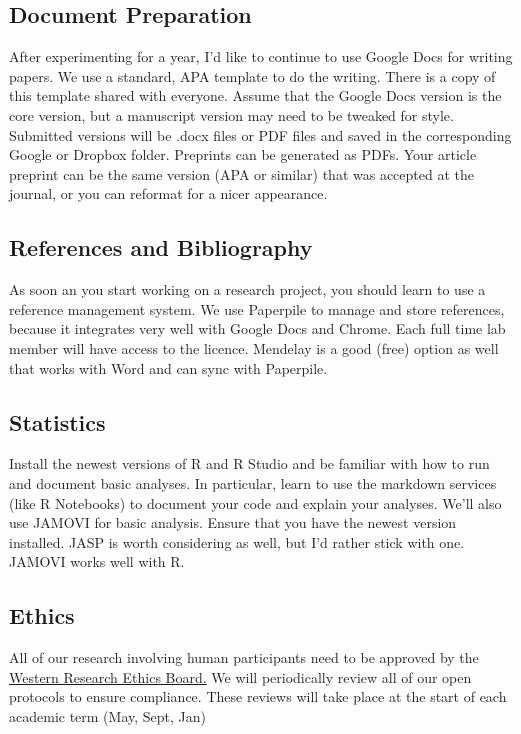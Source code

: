 \documentclass{article}
\begin{document}
\subsection{Document Preparation} 
After experimenting for a year, I’d like to continue to use Google Docs for writing papers. We use a standard, APA template to do the writing. There is a copy of this template shared with everyone. Assume that the Google Docs version is the core version, but a manuscript version may need to be tweaked for style. Submitted versions will be .docx files or PDF files and saved in the corresponding Google or Dropbox folder. Preprints can be generated as PDFs. Your article preprint can be the same version (APA or similar) that was accepted at the journal, or you can reformat for a nicer appearance. 

\subsection{References and Bibliography} 
As soon an you start working on a research project, you should learn to use a reference management system. We use Paperpile to manage and store references, because it integrates very well with Google Docs and Chrome. Each full time lab member will have access to the licence. Mendelay is a good (free) option as well that works with Word and can sync with Paperpile.

\subsection{Statistics}
Install the newest versions of R and R Studio and be familiar with how to run and document basic analyses. In particular, learn to use the markdown services (like R Notebooks) to document your code and explain your analyses. We’ll also use JAMOVI for basic analysis. Ensure that you have the newest version installed. JASP is worth considering as well, but I'd rather stick with one. JAMOVI works well with R.

\subsection{Ethics}\label{sec:Ethics}
All of our research involving human participants need to be approved by the \href{http://www.uwo.ca/research/services/ethics/index.html}{Western Research Ethics Board.} We will periodically review all of our open protocols to ensure compliance. These reviews will take place at the start of each academic term (May, Sept, Jan)
\end{document}
